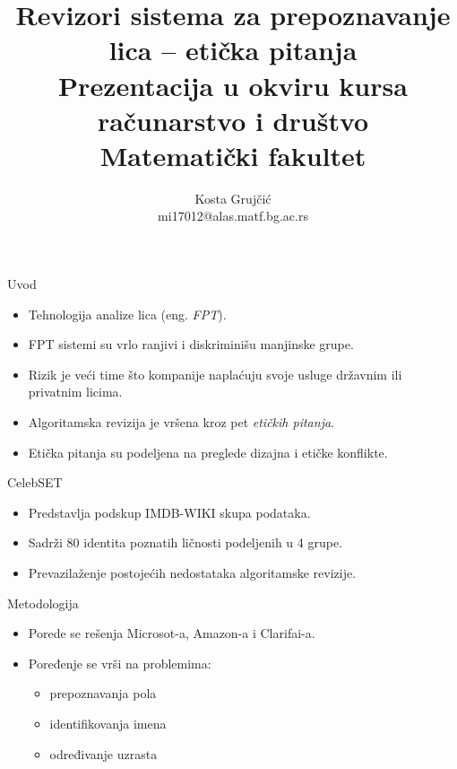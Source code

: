 \documentclass{beamer}
\title[]{Revizori sistema za prepoznavanje lica -- etička pitanja\\\small{Prezentacija u okviru kursa\\računarstvo i društvo\\Matematički fakultet}}
\author{Kosta Grujčić\\mi17012@alas.matf.bg.ac.rs}
\date{}
\begin{document}
	\begin{frame}
		\titlepage
	\end{frame}

	\begin{frame}{Uvod}
		\begin{itemize}
			\item Tehnologija analize lica (eng. \textit{FPT}).
			\bigskip
			\item FPT sistemi su vrlo ranjivi i diskriminišu manjinske grupe.
			\bigskip
			\item Rizik je veći time što kompanije naplaćuju svoje usluge državnim ili privatnim licima.
		\end{itemize}
	\end{frame}

	\begin{frame}
		\begin{itemize}
			\item Algoritamska revizija je vršena kroz pet \textit{etičkih pitanja}.
			\bigskip
			\item Etička pitanja su podeljena na preglede dizajna i etičke konflikte.
		\end{itemize}
	\end{frame}

	\begin{frame}{CelebSET}
		\begin{itemize}
			\item Predstavlja podskup IMDB-WIKI skupa podataka.
			\bigskip
			\item Sadrži 80 identita poznatih ličnosti podeljenih u 4 grupe.
			\bigskip
			\item Prevazilaženje postojećih nedostataka algoritamske revizije.
		\end{itemize}
	\end{frame}

	\begin{frame}{Metodologija}
		\begin{itemize}
			\item Porede se rešenja Microsot-a, Amazon-a i Clarifai-a.
			\bigskip
			\item Poređenje se vrši na problemima:
			\begin{itemize}
				\item prepoznavanja pola
				\item identifikovanja imena
				\item određivanje uzrasta
			\end{itemize}
		\end{itemize}
	\end{frame}
\end{document}
